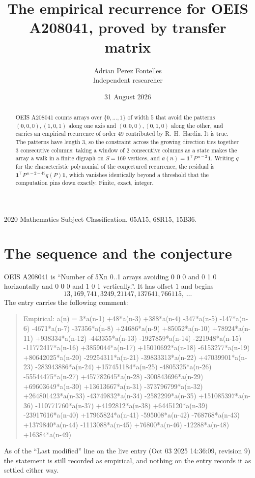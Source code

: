 \documentclass[11pt,a4paper]{article}
\title{The empirical recurrence for OEIS A208041, proved by transfer matrix}
\author{Adrian Perez Fontelles\\ \small Independent researcher}
\date{31 August 2026}
\theoremstyle{plain}
\theoremstyle{definition}
\begin{document}
\maketitle

\begin{abstract}
OEIS A208041 counts arrays over $\{0,\dots,1\}$ of width $5$ that avoid the patterns
$(0,0,0), (1,0,1)$ along one axis and $(0,0,0), (0,1,0)$ along the other, and carries an empirical recurrence of
order $49$ contributed by R.~H.~Hardin. It is true. The patterns have length $3$, so
the constraint across the growing direction ties together $3$ consecutive columns: taking a
window of $2$ consecutive columns as a state makes the array a walk in a finite digraph
on $S=169$ vertices, and $a(n)=\mathbf{1}^{\!\top}P^{\,n-2}\mathbf{1}$. Writing $q$
for the characteristic polynomial of the conjectured recurrence, the residual is
$\mathbf{1}^{\!\top}P^{\,n-2-49}q(P)\mathbf{1}$, which vanishes identically
beyond a threshold that the computation pins down exactly. Finite, exact, integer.
\end{abstract}

\noindent\small 2020 Mathematics Subject Classification. 05A15, 68R15, 15B36.\normalsize

\section{The sequence and the conjecture}

OEIS A208041 is ``Number of 5Xn 0..1 arrays avoiding 0 0 0 and 0 1 0 horizontally and 0 0 0 and 1 0 1 vertically.''. It has offset
$1$ and begins
\[
13, 169, 741, 3249, 21147, 137641, 766115,\ \dots
\]
The entry carries the following comment:
\begin{quote}\small
Empirical: a(n) = 3*a(n-1) +48*a(n-3) +388*a(n-4) -347*a(n-5) -147*a(n-6) -4671*a(n-7) -37356*a(n-8) +24686*a(n-9) +85052*a(n-10) +78924*a(n-11) +938334*a(n-12) -443355*a(n-13) -1927859*a(n-14) -221948*a(n-15) -11772417*a(n-16) +3859044*a(n-17) +15010692*a(n-18) -6153277*a(n-19) +80642025*a(n-20) -29254311*a(n-21) -39833313*a(n-22) +47039901*a(n-23) -283943886*a(n-24) +157451184*a(n-25) -4805325*a(n-26) -55544475*a(n-27) +457782645*a(n-28) -300843696*a(n-29) +69603649*a(n-30) +13613667*a(n-31) -373796799*a(n-32) +264801423*a(n-33) -43749832*a(n-34) -2582299*a(n-35) +151085397*a(n-36) -110771760*a(n-37) +4192812*a(n-38) +6445120*a(n-39) -23917616*a(n-40) +17965824*a(n-41) -595008*a(n-42) -768768*a(n-43) +1379840*a(n-44) -1113088*a(n-45) +76800*a(n-46) -12288*a(n-48) +16384*a(n-49)
\end{quote}
As of the ``Last modified'' line on the live entry (Oct 03 2025 14:36:09, revision
9) the statement is still recorded as empirical, and nothing on the entry
records it as settled either way.
\end{document}
